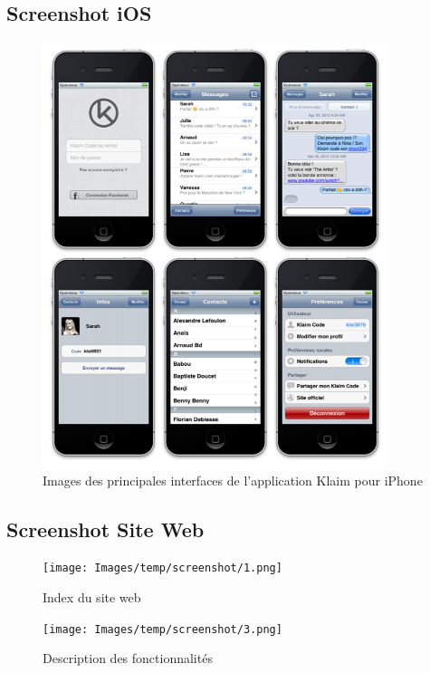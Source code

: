 \documentclass{article}
\begin{document}
	\subsection{Screenshot iOS}
	\begin{figure}[H]
  		\begin{center}
  			\includegraphics[width=0.9\textwidth]{Images/screenshot_iOS.png}
  			\caption{Images des principales interfaces de l'application Klaim pour iPhone}
  			\label{fig:animals}
		\end{center}
	\end{figure}
	
	\subsection{Screenshot Site Web}
		\begin{figure}[H]
  		\begin{center}
  			\texttt{[image: Images/temp/screenshot/1.png]}
  			\caption{Index du site web}
  			\label{fig:animals}
		\end{center}
	\end{figure}
	
	\begin{figure}[H]
  		\begin{center}
  			\texttt{[image: Images/temp/screenshot/3.png]}
  			\caption{Description des fonctionnalités}
  			\label{fig:animals}
		\end{center}
	\end{figure}
	
\end{document}

